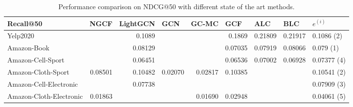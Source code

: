 \begin{table*}[]
    \centering
    \begin{tabular}{|l|r|r|r|r|r||r|r|l|}
        \hline
        Recall@50               & \multicolumn{1}{l|}{NGCF} & \multicolumn{1}{l|}{LightGCN} & \multicolumn{1}{l|}{GCN} & \multicolumn{1}{l|}{GC-MC} & \multicolumn{1}{l||}{GCF} & \multicolumn{1}{l|}{ALC} & \multicolumn{1}{l|}{BLC} & $e^{(i)}$   \\ \hline
        Yelp2020                &                           & 0.1089                        &                          &                            & 0.1869                    & 0.21809                  & 0.21917                  & 0.1086 (2)  \\ \hline
        Amazon-Book             &                           & 0.08129                       &                          &                            & 0.07035                   & 0.07919                  & 0.08066                  & 0.079 (1)   \\ \hline
        Amazon-Cell-Sport       &                           & 0.06451                       &                          &                            & 0.06536                   & 0.07002                  & 0.06928                  & 0.07377 (4) \\ \hline
        Amazon-Cloth-Sport      & 0.08501                   & 0.10482                       & 0.02070                  & 0.02817                    & 0.10385                   &                          &                          & 0.10541 (2) \\ \hline
        Amazon-Cell-Electronic  &                           & 0.07738                       &                          &                            &                           &                          &                          & 0.07909 (3) \\ \hline
        Amazon-Cloth-Electronic & 0.01863                   &                               &                          & 0.01690                    & 0.02948                   &                          &                          & 0.04061 (5) \\ \hline
    \end{tabular}
    \caption{Performance comparison on NDCG@50 with different state of the art methods.}
    \label{tab:recallbaselines}
\end{table*}